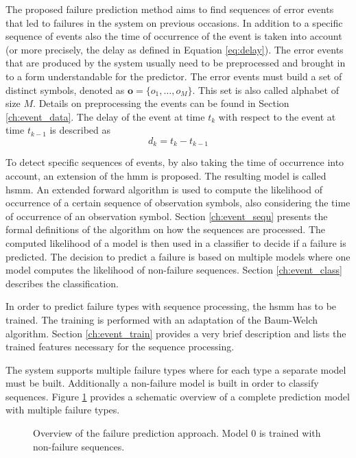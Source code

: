 \documentclass[mscthesis]{usiinfthesis}
\begin{document}
The proposed failure prediction method aims to find sequences of error events
that led to failures in the system on previous occasions. In addition to
a specific sequence of events also the time of occurrence of the event is taken
into account (or more precisely, the delay as defined in Equation
\ref{eq:delay}). The error events that are produced by the system usually need
to be preprocessed and brought in to a form understandable for the predictor.
The error events must build a set of distinct symbols, denoted as
$\boldsymbol{o}=\{o_1, \dots, o_M\}$. This set is also called alphabet of size
$M$. Details on preprocessing the events can be found in Section
\ref{ch:event_data}. The delay of the event at time $ t_k $ with respect to the
event at time $ t_{k-1} $ is described as
\begin{equation}
\label{eq:delay}
    d_k = t_k-t_{k-1}
\end{equation}

To detect specific sequences of events, by also taking the time of occurrence
into account, an extension of the \gls{hmm} is proposed. The resulting model is
called \acrfull{hsmm}. An extended forward algorithm is used to compute the
likelihood of occurrence of a certain sequence of observation symbols, also
considering the time of occurrence of an observation symbol. Section
\ref{ch:event_sequ} presents the formal definitions of the algorithm on how the
sequences are processed. The computed likelihood of a model is then used in
a classifier to decide if a failure is predicted. The decision to predict
a failure is based on multiple models where one model computes the likelihood
of non-failure sequences. Section \ref{ch:event_class} describes the
classification.

In order to predict failure types with sequence processing, the \gls{hsmm} has
to be trained. The training is performed with an adaptation of the Baum-Welch
algorithm. Section \ref{ch:event_train} provides a very brief description and
lists the trained features necessary for the sequence processing.

The system supports multiple failure types where for each type a separate
model must be built. Additionally a non-failure model is built in order to
classify sequences. Figure \ref{fig:model} provides a schematic overview of
a complete prediction model with multiple failure types.

\begin{figure}
    \centering
    
    \caption{Overview of the failure prediction approach. Model 0 is trained
        with non-failure sequences.}
    \label{fig:model}
\end{figure}
\end{document}
